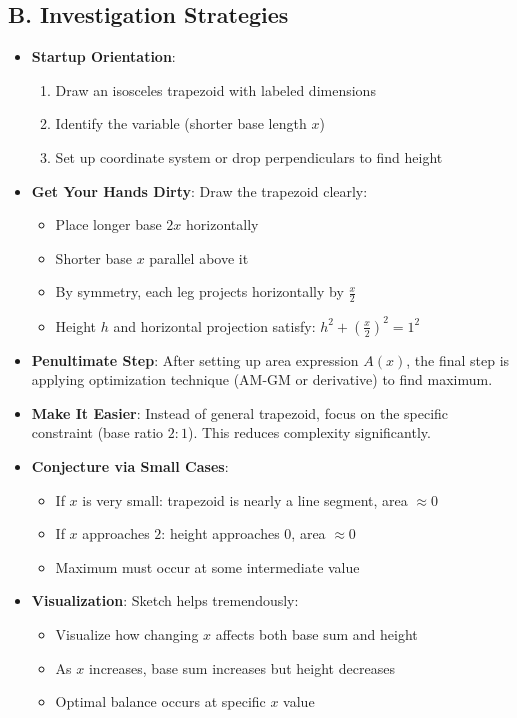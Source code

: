 \documentclass[12pt]{article}
\begin{document}
\begin{strategicbox}
\subsection*{B. Investigation Strategies}
\begin{itemize}[leftmargin=*]
    \item \textbf{Startup Orientation}: 
    \begin{enumerate}
        \item Draw an isosceles trapezoid with labeled dimensions
        \item Identify the variable (shorter base length $x$)
        \item Set up coordinate system or drop perpendiculars to find height
    \end{enumerate}
    \item \textbf{Get Your Hands Dirty}: Draw the trapezoid clearly:
    \begin{itemize}
        \item Place longer base $2x$ horizontally
        \item Shorter base $x$ parallel above it
        \item By symmetry, each leg projects horizontally by $\frac{x}{2}$
        \item Height $h$ and horizontal projection satisfy: $h^2 + \left(\frac{x}{2}\right)^2 = 1^2$
    \end{itemize}
    \item \textbf{Penultimate Step}: After setting up area expression $A(x)$, the final step is applying optimization technique (AM-GM or derivative) to find maximum.
    \item \textbf{Make It Easier}: Instead of general trapezoid, focus on the specific constraint (base ratio $2:1$). This reduces complexity significantly.
    \item \textbf{Conjecture via Small Cases}: 
    \begin{itemize}
        \item If $x$ is very small: trapezoid is nearly a line segment, area $\approx 0$
        \item If $x$ approaches $2$: height approaches $0$, area $\approx 0$
        \item Maximum must occur at some intermediate value
    \end{itemize}
    \item \textbf{Visualization}: Sketch helps tremendously:
    \begin{itemize}
        \item Visualize how changing $x$ affects both base sum and height
        \item As $x$ increases, base sum increases but height decreases
        \item Optimal balance occurs at specific $x$ value
    \end{itemize}
\end{itemize}


\end{strategicbox}
\end{document}
